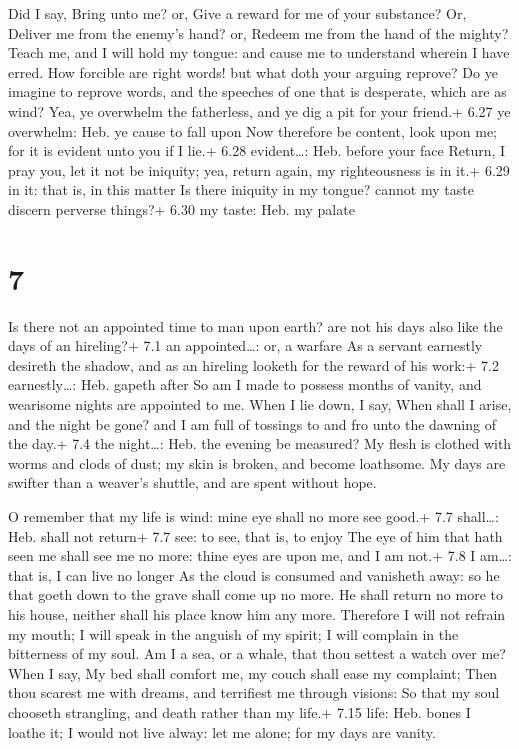  Did I say, Bring unto me? or, Give a reward for me of your
substance?  Or, Deliver me from the enemy's hand? or,
Redeem me from the hand of the mighty?  Teach me, and I
will hold my tongue: and cause me to understand wherein I have erred.
 How forcible are right words! but what doth your arguing
reprove?  Do ye imagine to reprove words, and the speeches
of one that is desperate, which are as wind?  Yea, ye
overwhelm the fatherless, and ye dig a pit for your friend.+ 6.27 ye
overwhelm: Heb. ye cause to fall upon  Now therefore be
content, look upon me; for it is evident unto you if I lie.+ 6.28
evident\ldots: Heb. before your face  Return, I pray you,
let it not be iniquity; yea, return again, my righteousness is in it.+
6.29 in it: that is, in this matter  Is there iniquity in
my tongue? cannot my taste discern perverse things?+ 6.30 my taste: Heb.
my palate

\hypertarget{section-6}{%
\section{7}\label{section-6}}

 Is there not an appointed time to man upon earth? are not
his days also like the days of an hireling?+ 7.1 an appointed\ldots: or,
a warfare  As a servant earnestly desireth the shadow, and
as an hireling looketh for the reward of his work:+ 7.2 earnestly\ldots:
Heb. gapeth after  So am I made to possess months of vanity,
and wearisome nights are appointed to me.  When I lie down,
I say, When shall I arise, and the night be gone? and I am full of
tossings to and fro unto the dawning of the day.+ 7.4 the night\ldots:
Heb. the evening be measured?  My flesh is clothed with
worms and clods of dust; my skin is broken, and become loathsome.
 My days are swifter than a weaver's shuttle, and are spent
without hope.

 O remember that my life is wind: mine eye shall no more see
good.+ 7.7 shall\ldots: Heb. shall not return+ 7.7 see: to see, that is,
to enjoy  The eye of him that hath seen me shall see me no
more: thine eyes are upon me, and I am not.+ 7.8 I am\ldots: that is, I
can live no longer  As the cloud is consumed and vanisheth
away: so he that goeth down to the grave shall come up no more.
 He shall return no more to his house, neither shall his
place know him any more.  Therefore I will not refrain my
mouth; I will speak in the anguish of my spirit; I will complain in the
bitterness of my soul.  Am I a sea, or a whale, that thou
settest a watch over me?  When I say, My bed shall comfort
me, my couch shall ease my complaint;  Then thou scarest me
with dreams, and terrifiest me through visions:  So that my
soul chooseth strangling, and death rather than my life.+ 7.15 life:
Heb. bones  I loathe it; I would not live alway: let me
alone; for my days are vanity.

